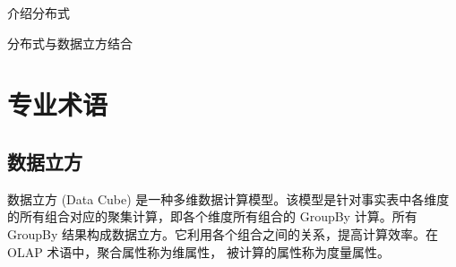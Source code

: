 介绍分布式

分布式与数据立方结合





\section{专业术语}

\subsection{数据立方}
数据立方 (Data Cube) \cite{gray1997data} 是一种多维数据计算模型。该模型是针对事实表中各维度的所有组合对应的聚集计算，即各个维度所有组合的 GroupBy 计算。所有 GroupBy 结果构成数据立方。它利用各个组合之间的关系，提高计算效率。在 OLAP 术语中，聚合属性称为维属性， 被计算的属性称为度量属性。



